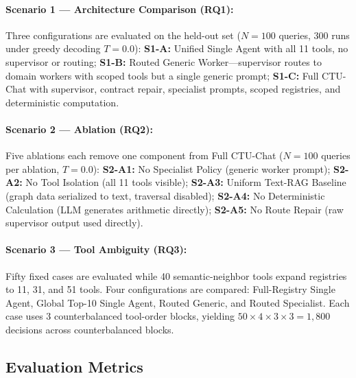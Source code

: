 \paragraph{Scenario 1 --- Architecture Comparison (RQ1):}
Three configurations are evaluated on the held-out set ($N{=}100$ queries, 300 runs under greedy decoding $T{=}0.0$):
\textbf{S1-A:} Unified Single Agent with all 11 tools, no supervisor or routing;
\textbf{S1-B:} Routed Generic Worker---supervisor routes to domain workers with scoped tools but a single generic prompt;
\textbf{S1-C:} Full CTU-Chat with supervisor, contract repair, specialist prompts, scoped registries, and deterministic computation.

\paragraph{Scenario 2 --- Ablation (RQ2):}
Five ablations each remove one component from Full CTU-Chat ($N{=}100$ queries per ablation, $T{=}0.0$):
\textbf{S2-A1:} No Specialist Policy (generic worker prompt);
\textbf{S2-A2:} No Tool Isolation (all 11 tools visible);
\textbf{S2-A3:} Uniform Text-RAG Baseline (graph data serialized to text, traversal disabled);
\textbf{S2-A4:} No Deterministic Calculation (LLM generates arithmetic directly);
\textbf{S2-A5:} No Route Repair (raw supervisor output used directly).

\paragraph{Scenario 3 --- Tool Ambiguity (RQ3):}
Fifty fixed cases are evaluated while 40 semantic-neighbor tools expand registries to 11, 31, and 51 tools. Four configurations are compared: Full-Registry Single Agent, Global Top-10 Single Agent, Routed Generic, and Routed Specialist. Each case uses 3 counterbalanced tool-order blocks, yielding $50 \times 4 \times 3 \times 3 = 1{,}800$ decisions across counterbalanced blocks.

\subsection{Evaluation Metrics}
\label{sec:metrics}

